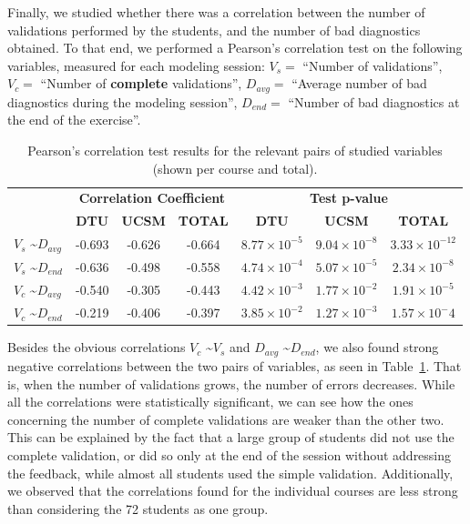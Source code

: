 Finally, we studied whether there was a correlation between the number of validations performed by the students, and the number of bad diagnostics obtained. To that end, we performed a Pearson's correlation test on the following variables, measured for each modeling session: $V_s =$ ``Number of validations'', $V_c =$ ``Number of \textbf{complete} validations'', $D_{avg} =$ ``Average number of bad diagnostics during the modeling session'', $D_{end} =$ ``Number of bad diagnostics at the end of the exercise''.
\begin{table}
{\scriptsize
\begin{tabular}{l|c c c| c c c }
& \multicolumn{3}{|c|}{\textbf{Correlation Coefficient}} & \multicolumn{3}{|c}{\textbf{Test p-value}} \\
& \textbf{DTU} & \textbf{UCSM} & \textbf{TOTAL} & \textbf{DTU} & \textbf{UCSM} & \textbf{TOTAL} \\
\hline
$V_s$ \textasciitilde $D_{avg}$ & -0.693 & -0.626 & -0.664 & $8.77\times10^{-5}$ & $9.04\times10^{-8}$ & $3.33\times10^{-12}$ \\
$V_s$ \textasciitilde $D_{end}$ & -0.636 & -0.498 & -0.558 & $4.74\times10^{-4}$ & $5.07\times10^{-5}$ & $2.34\times10^{-8}$ \\
$V_c$ \textasciitilde $D_{avg}$ & -0.540 & -0.305 & -0.443 & $4.42\times10^{-3}$ & $1.77\times10^{-2}$ & $ 1.91\times10^{-5}$ \\
$V_c$ \textasciitilde $D_{end}$ & -0.219 & -0.406 & -0.397 & $3.85\times10^{-2}$ & $1.27\times10^{-3}$ & $1.57\times10^-4$ \\
\hline
\end{tabular}}
\caption{Pearson's correlation test results for the relevant pairs of studied variables (shown per course and total).}
\label{tab:correlations}
\end{table}
Besides the obvious correlations $V_c$ \textasciitilde $V_s$ and $D_{avg}$ \textasciitilde $D_{end}$, we also found strong negative correlations between the two pairs of variables, as seen in Table~\ref{tab:correlations}. That is, when the number of validations grows, the number of errors decreases. While all the correlations were statistically significant, we can see how the ones concerning the number of complete validations are weaker than the other two. %
This can be explained by the fact that a large group of students did not use the complete validation, or did so only at the end of the session without addressing the feedback, while almost all students used the simple validation.
Additionally, we observed that the correlations found for the individual courses are less strong than considering the 72 students as one group.  

